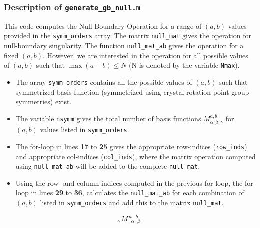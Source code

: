 \subsubsection{Description of \texttt{generate\_gb\_null.m}}

This code computes the Null Boundary Operation for a range of $(a,b)$ values
provided in the \verb|symm_orders| array. The matrix \verb|null_mat| gives the
operation for null-boundary singularity. The function \verb|null_mat_ab| gives
the operation for a fixed $(a,b)$. However, we are interested in the operation
for all possible values of $(a,b)$ such that $\max(a+b) \leq N$ (N is denoted by
the variable \verb|Nmax|).

\begin{itemize}
\item The array \verb|symm_orders| contains all the possible values of $(a,b)$
  such that symmetrized basis function (symmetrized using crystal rotation point
  group symmetries) exist.
\item The variable \verb|nsymm| gives the total number of basis functions
  $M^{a,b}_{\alpha, \beta, \gamma}$ for $(a,b)$ values listed in
  \verb|symm_orders|.
\item The for-loop in lines \textbf{17} to \textbf{25} gives the appropriate
  row-indices (\verb|row_inds|) and appropriate col-indices (\verb|col_inds|),
  where the matrix operation computed using \verb|null_mat_ab| will be added to
  the complete \verb|null_mat|.
\item Using the row- and column-indices computed in the previous for-loop, the
  for loop in lines \textbf{29} to \textbf{36}, calculates the
  \verb|null_mat_ab| for each combination of $(a,b)$ listed in
  \verb|symm_orders| and add this to the matrix \verb|null_mat|.
\end{itemize}

\clearpage
\newpage

\begin{equation}
  \label{eq:mbp}
\tensor[_{\gamma}]{M}{^a_{\alpha}^b_{\beta}}
\end{equation}
% 